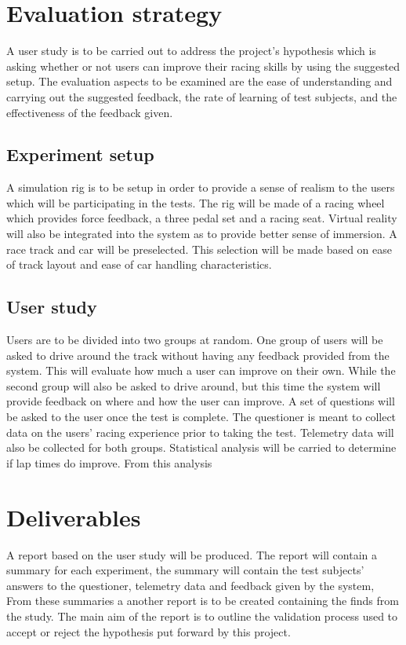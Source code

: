 \documentclass{article}
\begin{document}
\section{Evaluation strategy}

A user study is to be carried out to address the project's hypothesis which is asking whether or not users can improve their racing skills by using the suggested setup. The evaluation aspects to be examined are the ease of understanding and carrying out the suggested feedback, the rate of learning of test subjects, and the effectiveness of the feedback given.

\subsection{Experiment setup}
A simulation rig is to be setup in order to provide a sense of realism to the users which will be participating in the tests. The rig will be made of a racing wheel which provides force feedback, a three pedal set and a racing seat. Virtual reality will also be integrated into the system as to provide better sense of immersion. A race track and car will be preselected. This selection will be made based on ease of track layout and ease of car handling characteristics. 

\subsection{User study}
Users are to be divided into two groups at random. One group of users will be asked to drive around the track without having any feedback provided from the system. This will evaluate how much a user can improve on their own. While the second group will also be asked to drive around, but this time the system will provide feedback on where and how the user can improve. A set of questions will be asked to the user once the test is complete. The questioner is meant to collect data on the users' racing experience prior to taking the test. Telemetry data will also be collected for both groups. Statistical analysis will be carried to determine if lap times do improve. From this analysis 

\section{Deliverables}
A report based on the user study will be produced. The report will contain a summary for each experiment, the summary will contain the test subjects' answers to the questioner, telemetry data and feedback given by the system, From these summaries a another report is to be created containing the finds from the study. The main aim of the report is to outline the validation process used to accept or reject the hypothesis put forward by this project.
\end{document}
